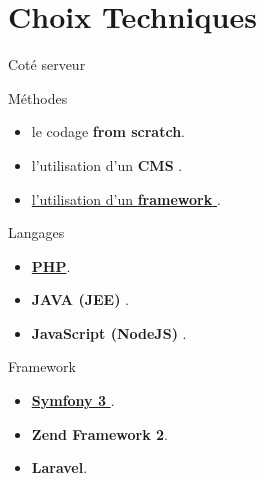 \documentclass[french]{beamer}
\begin{document}
\section{Choix Techniques}
\begin{frame}{Coté serveur}
\begin{exampleblock}{Méthodes}

\begin{itemize}
\item le codage  \textbf{from scratch}.
\item l'utilisation d'un \textbf{CMS}  .
\item \underline{l'utilisation d'un \textbf{framework} } .
\end{itemize}	

\end{exampleblock}
\pause

\begin{exampleblock}{Langages}

\begin{itemize}
\item \underline{ \textbf{PHP}}.
\item \textbf{JAVA (JEE)}  .
\item \textbf{JavaScript (NodeJS)} .
\end{itemize}	

\end{exampleblock}
\pause
\begin{exampleblock}{Framework}
	
\begin{itemize}
\item \underline{ \textbf{Symfony 3} }.
\item \textbf{Zend Framework 2}.
\item \textbf{Laravel}.
\end{itemize}

\end{exampleblock}
	
	
\end{frame}
\end{document}
